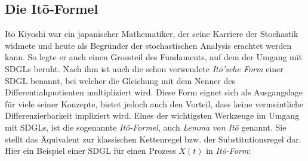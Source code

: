 \subsection{Die Itō-Formel\label{brown:ito}}
Itō Kiyoshi war ein japanischer Mathematiker, der seine Karriere der Stochastik widmete und heute als Begründer der stochastischen Analysis erachtet werden kann. So legte er auch einen Grossteil des Fundaments, auf dem der Umgang mit SDGLs beruht. Nach ihm ist auch die schon verwendete \textit{Itō'sche Form} einer SDGL benannt, bei welcher die Gleichung mit dem Nenner des Differentialquotienten multipliziert wird. Diese Form eignet sich als Ausgangslage für viele seiner Konzepte, bietet jedoch auch den Vorteil, dass keine vermeintliche Differenzierbarkeit impliziert wird.
Eines der wichtigsten Werkzeuge im Umgang mit SDGLs, ist die sogenannte \textit{Itō-Formel}, auch \textit{Lemma von Itō} genannt. Sie stellt das Äquivalent zur klassischen Kettenregel bzw. der Substitutionsregel dar. Hier ein Beispiel einer SDGL für einen Prozess $ X(t) $ in \textit{Itō-Form}:


